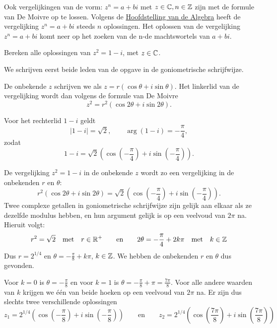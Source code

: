 \documentclass{ximera}
\begin{document}
    \author{Zomercursus KU Leuven}
     
    \label{xim:complexe_getallen_demoivre}









Ook vergelijkingen van de vorm: $z^n=a+bi$ met $z\in \mathbb{C}, n\in \mathbb{Z}$ zijn met de formule van De Moivre op te lossen. Volgens de \hyperref[def:hoofdstelling_algebra]{Hoofdstelling van de Algebra} heeft de vergelijking $z^n=a+bi$ steeds $n$ oplossingen. Het oplossen van de vergelijking $z^n=a+bi$ komt neer op het zoeken van de n-de machtswortels van $a+bi$.
 
\begin{exercise}
    Bereken alle oplossingen van $z^2 = 1 - i$, met $z \in \mathbb{C}$.
    \begin{oplossing}
        We schrijven eerst beide leden van de opgave in de goniometrische schrijfwijze.
         
        De onbekende $z$ schrijven we als $z = r(\cos\theta+i\sin\theta)$. Het linkerlid van de vergelijking wordt dan volgens de formule van De Moivre $$z^2 = r^2 (\cos 2\theta+i\sin 2\theta).$$
         
        Voor het rechterlid $1-i$ geldt
        \[ |1-i| = \sqrt{2}, \qquad \arg (1-i) = - \frac{\pi}{4}, \]
        zodat
        \[ 1-i = \sqrt{2}( \cos(-\frac{\pi}{4}) + i \sin(-\frac{\pi}{4})). \]
         
        De
        vergelijking $z^2 = 1-i$ in de onbekende $z$ wordt zo een vergelijking in de onbekenden $r$ en $\theta$:
        $$r^2 (\cos 2\theta+i\sin 2\theta) = \sqrt{2} ( \cos(-\frac{\pi}{4}) + i \sin(-\frac{\pi}{4})).$$
        Twee complexe getallen in goniometrische schrijfwijze zijn gelijk aan elkaar als ze dezelfde modulus hebben, en hun argument gelijk is op een veelvoud van $2 \pi$ na.
        Hieruit volgt:
        \[ r^2 = \sqrt{2} \quad \text{met} \quad r\in \mathbb{R}^+ \qquad \text{en} \qquad 2 \theta = - \frac{\pi}{4} + 2 k \pi \quad \text{met} \quad k\in \mathbb{Z}\]
        Dus $r= 2^{1/4}$ en $\theta = - \frac{\pi}{8} + k \pi$, $k \in \mathbb{Z}$. We hebben de onbekenden $r$ en $\theta$ dus gevonden.
         
         Voor $k=0$ is
        $\theta = - \frac{\pi}{8}$ en voor $k=1$ is $\theta = -
        \frac{\pi}{8} + \pi = \frac{7\pi}{8}$. Voor alle andere waarden van $k$ krijgen we één van beide hoeken op een veelvoud van $2 \pi$ na. Er zijn dus slechts twee verschillende oplossingen
        \[ z_1 = 2^{1/4}( \cos(-\frac{\pi}{8}) + i \sin(-\frac{\pi}{8}))  \qquad \text{en} \qquad
        z_2 = 2^{1/4}( \cos(\frac{7\pi}{8}) + i \sin(\frac{7\pi}{8}))  \]
         
    \end{oplossing}
\end{exercise}
 
\end{document}
